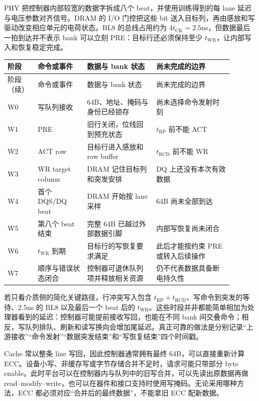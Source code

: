 PHY 把控制器内部较宽的数据字拆成八个 beat，并使用训练得到的每 lane 延迟与电压参数对齐信号。DRAM 的 I/O 门控把这些 bit 送入目标列，再由感放和写驱动改变相应单元的电荷状态。BL8 的总线占用约为 $4t_{\mathrm{CK}}=2.5$ns，但数据最后一拍到达并不表示 bank 可以立刻 PRE：目标行还必须保持至少 $t_{\mathrm{WR}}$，让内部写入和恢复稳定完成。

\begin{longtable}{L{0.10\linewidth}L{0.20\linewidth}L{0.28\linewidth}L{0.31\linewidth}}
\toprule
阶段 & 命令或事件 & 数据与 bank 状态 & 尚未完成的边界 \\
\midrule
\endfirsthead
\toprule
阶段（续） & 命令或事件 & 数据与 bank 状态 & 尚未完成的边界 \\
\midrule
\endhead
W0 & 写队列接收 & 64B、地址、掩码与身份已经锁存 & 尚未选择命令发射时刻 \\\tablerowrule
W1 & PRE & 旧行关闭，位线回到预充状态 & $t_{\mathrm{RP}}$ 前不能 ACT \\\tablerowrule
W2 & ACT row  & 目标行进入感放和 row buffer & $t_{\mathrm{RCD}}$ 前不能 WR \\\tablerowrule
W3 & WR target column & DRAM 记住目标列和突发安排 & DQ 上还没有本次有效数据 \\\tablerowrule
W4 & 首个 DQS/DQ beat & DRAM 开始按 lane 采样 & 64B 尚未全部到达 \\\tablerowrule
W5 & 第八个 beat 结束 & 完整 64B 已越过外部数据引脚 & 内部写恢复尚未闭合 \\\tablerowrule
W6 & $t_{\mathrm{WR}}$ 到期 & 目标行的写恢复要求满足 & 此后才能按约束 PRE 或转入后续操作 \\\tablerowrule
W7 & 顺序与错误状态闭合 & 控制器可退休队列项并释放相关资源 & 仍不代表数据具备断电持久性 \\
\bottomrule
\end{longtable}

若只看介质侧的简化关键路径，行冲突写入包含 $t_{\mathrm{RP}}+t_{\mathrm{RCD}}$、写命令到突发的等待、2.5ns 的 BL8 以及最后一个 beat 后的 $t_{\mathrm{WR}}$。这些时段并非都能简单相加为处理器看到的延迟：控制器可能提前接收写回，也能在不同 bank 间交叠命令；相反，写队列排队、刷新和读写换向会增加尾延迟。真正可靠的做法是分别记录“上游接收”“命令发射”“数据突发结束”和“写恢复结束”四个时间戳。


Cache 常以整条 line 写回，因此控制器通常拥有最终 64B，可以直接重新计算 ECC。设备小写、非缓存写或字节存储合并不足时，请求可能只带部分 byte enable。此时平台可以在控制器内与队列中的旧写合并，可以先读出原数据再做 read--modify--write，也可以在器件和接口支持时使用写掩码。无论采用哪种方法，ECC 都必须对应“合并后的最终数据”，不能拿旧 ECC 配新数据。

